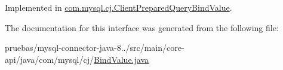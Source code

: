 Implemented in \mbox{\hyperlink{classcom_1_1mysql_1_1cj_1_1_client_prepared_query_bind_value_a91a77d92aa03fd7a0ada64374a25e2fb}{com.\+mysql.\+cj.\+Client\+Prepared\+Query\+Bind\+Value}}.



The documentation for this interface was generated from the following file\+:\begin{DoxyCompactItemize}
\item 
pruebas/mysql-\/connector-\/java-\/8../src/main/core-\/api/java/com/mysql/cj/\mbox{\hyperlink{_bind_value_8java}{Bind\+Value.\+java}}\end{DoxyCompactItemize}
